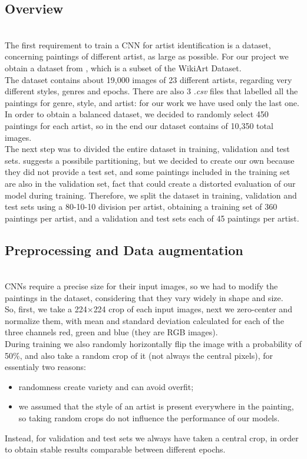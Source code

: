 \documentclass{article}
\begin{document}
\subsection{Overview}\mbox{}\\
The first requirement to train a CNN for artist identification is a dataset, concerning paintings of different artist, as large as possible. For our project we obtain a dataset from \cite{ArtGANDataset}, which is a subset of the WikiArt Dataset. \\
The dataset contains about 19,000 images of 23 different artists, regarding very different styles, genres  and epochs. There are also 3 \textit{.csv} files that labelled all the paintings for genre, style, and artist: for our work we have used only the last one. In order to obtain a balanced dataset, we decided to randomly select 450 paintings for each artist, so in the end our dataset contains of 10,350 total images. \\
The next step was to divided the entire dataset in training, validation and test sets. \cite{ArtGANDataset} suggests a possibile partitioning, but we decided to create our own because they did not provide a test set, and some paintings included in the training set are also in the validation set, fact that could create a distorted evaluation of our model during training. Therefore, we split the dataset in training, validation and test sets using a 80-10-10 division per artist, obtaining a training set of 360 paintings per artist, and a validation and test sets each of 45 paintings per artist.

\subsection{Preprocessing and Data augmentation}\mbox{}\\
CNNs require a precise size for their input images, so we had to modify the paintings in the dataset, considering that they vary widely in shape and size.\\
So, first, we take a 224$\times$224 crop of each input images, next we zero-center and normalize them, with mean and standard deviation calculated for each of the three channels red, green and blue (they are RGB images).  \\
During training we also randomly horizontally flip the image with a probability of 50\%, and also take a random crop of it (not always the central pixels), for essentialy two reasons:
\begin{itemize}
	\item randomness create variety and can avoid overfit;
	\item we assumed that the style of an artist is present everywhere in the painting, so taking random crops do not influence the performance of our models.
\end{itemize}
Instead, for validation and test sets we always have taken a central crop, in order to obtain stable results comparable between different epochs.
\end{document}

